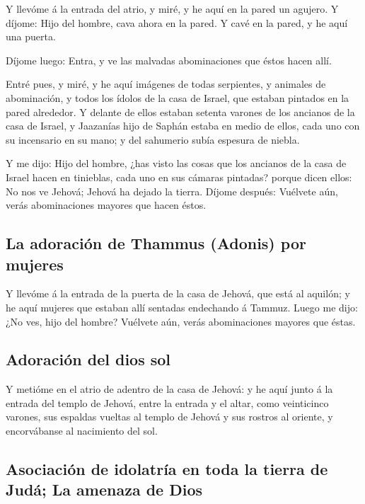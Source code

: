  Y llevóme á la entrada del atrio, y miré, y he aquí en la
pared un agujero.  Y díjome: Hijo del hombre, cava ahora en
la pared. Y cavé en la pared, y he aquí una puerta.

 Díjome luego: Entra, y ve las malvadas abominaciones que
éstos hacen allí.

 Entré pues, y miré, y he aquí imágenes de todas
serpientes, y animales de abominación, y todos los ídolos de la casa de
Israel, que estaban pintados en la pared alrededor.  Y
delante de ellos estaban setenta varones de los ancianos de la casa de
Israel, y Jaazanías hijo de Saphán estaba en medio de ellos, cada uno
con su incensario en su mano; y del sahumerio subía espesura de niebla.

 Y me dijo: Hijo del hombre, ¿has visto las cosas que los
ancianos de la casa de Israel hacen en tinieblas, cada uno en sus
cámaras pintadas? porque dicen ellos: No nos ve Jehová; Jehová ha dejado
la tierra.  Díjome después: Vuélvete aún, verás
abominaciones mayores que hacen éstos.

\hypertarget{la-adoraciuxf3n-de-thammus-adonis-por-mujeres}{%
\subsection{La adoración de Thammus (Adonis) por
mujeres}\label{la-adoraciuxf3n-de-thammus-adonis-por-mujeres}}

 Y llevóme á la entrada de la puerta de la casa de Jehová,
que está al aquilón; y he aquí mujeres que estaban allí sentadas
endechando á Tammuz.  Luego me dijo: ¿No ves, hijo del
hombre? Vuélvete aún, verás abominaciones mayores que éstas.

\hypertarget{adoraciuxf3n-del-dios-sol}{%
\subsection{Adoración del dios sol}\label{adoraciuxf3n-del-dios-sol}}

 Y metióme en el atrio de adentro de la casa de Jehová: y
he aquí junto á la entrada del templo de Jehová, entre la entrada y el
altar, como veinticinco varones, sus espaldas vueltas al templo de
Jehová y sus rostros al oriente, y encorvábanse al nacimiento del sol.

\hypertarget{asociaciuxf3n-de-idolatruxeda-en-toda-la-tierra-de-juduxe1-la-amenaza-de-dios}{%
\subsection{Asociación de idolatría en toda la tierra de Judá; La
amenaza de
Dios}\label{asociaciuxf3n-de-idolatruxeda-en-toda-la-tierra-de-juduxe1-la-amenaza-de-dios}}

